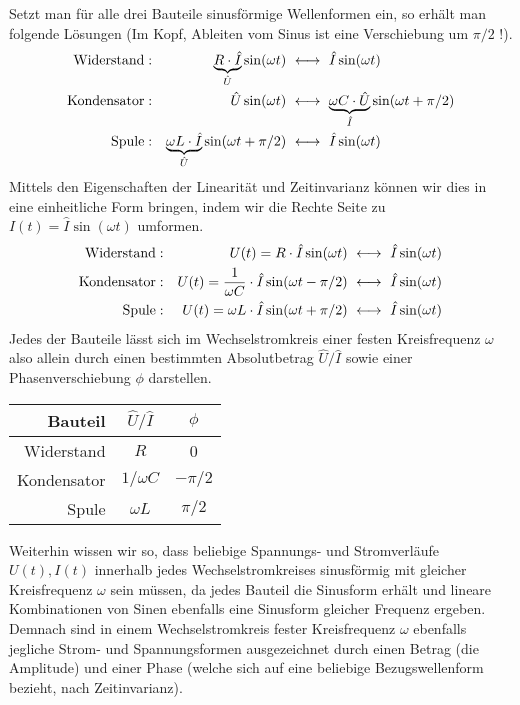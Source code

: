Setzt man für alle drei Bauteile sinusförmige Wellenformen ein, so erhält man folgende Lösungen (Im Kopf, Ableiten vom
Sinus ist eine Verschiebung um $\pi/2$ !).
\begin{align*}
    \text{Widerstand} &: & \underbrace{R\cdot \hat I}_{\hat U}\sin(\omega t)
    & ~\longleftrightarrow~ \hat{I}\sin(\omega t)
    \\
    \text{Kondensator} &: & \hat U\sin(\omega t)
    & ~\longleftrightarrow~ \underbrace{\omega C \cdot \hat U}_{\hat{I}}\sin(\omega t + \pi/2)
    \\
\text{Spule} &: &  \underbrace{\omega L\cdot \hat I}_{\hat U}\sin(\omega t + \pi/2)
    & ~\longleftrightarrow~ \hat{I}\sin(\omega t)
\end{align*}
Mittels den Eigenschaften der Linearität und Zeitinvarianz können wir dies in eine einheitliche Form bringen, indem wir
die Rechte Seite zu $I(t) = \hat I\sin(\omega t)$ umformen.
\begin{gather}\label{eq:RLC}
\begin{aligned}
    \text{Widerstand} &: & U(t) = R \cdot \hat I\sin(\omega t)
    & ~\longleftrightarrow~ \hat{I}\sin(\omega t)
    \\
    \text{Kondensator} &: & U(t) = {1\over \omega C}\cdot  \hat I\sin(\omega t - \pi/2)
    & ~\longleftrightarrow~ \hat{I}\sin(\omega t)
    \\
\text{Spule} &: &  U(t) = \omega L \cdot \hat I\sin(\omega t + \pi/2)
    & ~\longleftrightarrow~ \hat{I}\sin(\omega t)
\end{aligned}
\end{gather}
Jedes der Bauteile lässt sich im Wechselstromkreis einer festen Kreisfrequenz $\omega$ also allein durch einen
bestimmten Absolutbetrag $\hat U / \hat I$ sowie einer Phasenverschiebung $\phi$ darstellen.
\begin{center}
    \begin{tabular}{rcc}
        Bauteil & $\hat U / \hat I$ & $\phi$ \\
        \hline
        Widerstand & $R$ & 0 \\
        Kondensator & ${1/\omega C}$ & $-\pi/2$ \\
        Spule & $\omega L$ & $\pi/2$
    \end{tabular}
\end{center}

Weiterhin wissen wir so, dass beliebige Spannungs- und Stromverläufe $U(t), I(t)$ innerhalb jedes Wechselstromkreises
sinusförmig mit gleicher Kreisfrequenz $\omega$ sein müssen, da jedes Bauteil die Sinusform erhält und lineare
Kombinationen von Sinen ebenfalls eine Sinusform gleicher Frequenz ergeben. Demnach sind in einem Wechselstromkreis
fester Kreisfrequenz $\omega$ ebenfalls jegliche Strom- und Spannungsformen ausgezeichnet durch einen Betrag (die
Amplitude) und einer Phase (welche sich auf eine beliebige Bezugswellenform bezieht, nach Zeitinvarianz).

